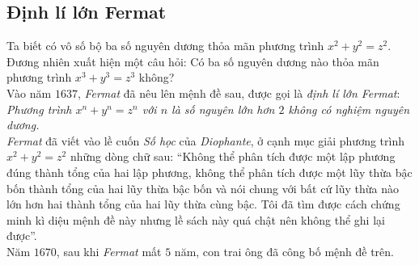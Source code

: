 \subsection{Định lí lớn Fermat}
Ta biết có vô số bộ ba số nguyên dương thỏa mãn phương trình $x^2+y^2=z^2$. Đương nhiên xuất hiện một câu hỏi: Có ba số nguyên dương nào thỏa mãn phương trình $x^3+y^3=z^3$ không?\\
Vào năm $1637$, \textit{Fermat} đã nêu lên mệnh đề sau, được gọi là \textit{định lí lớn Fermat}:\\
\textit{Phương trình $x^n+y^n=z^n$ với $n$ là số nguyên lớn hơn $2$ không có nghiệm nguyên dương.}\\
\textit{Fermat} đã viết vào lề cuốn \textit{Số học} của \textit{Diophante}, ở cạnh mục giải phương trình $x^2+y^2=z^2$ những dòng chữ sau: ``Không thể phân tích được một lập phương đúng thành tổng của hai lập phương, không thể phân tích được một lũy thừa bậc bốn thành tổng của hai lũy thừa bậc bốn và nói chung với bất cứ lũy thừa nào lớn hơn hai thành tổng của hai lũy thừa cùng bậc. Tôi đã tìm được cách chứng minh kì diệu mệnh đề này nhưng lề sách này quá chật nên không thể ghi lại được''.\\
Năm $1670$, sau khi \textit{Fermat} mất $5$ năm, con trai ông đã công bố mệnh đề trên.
